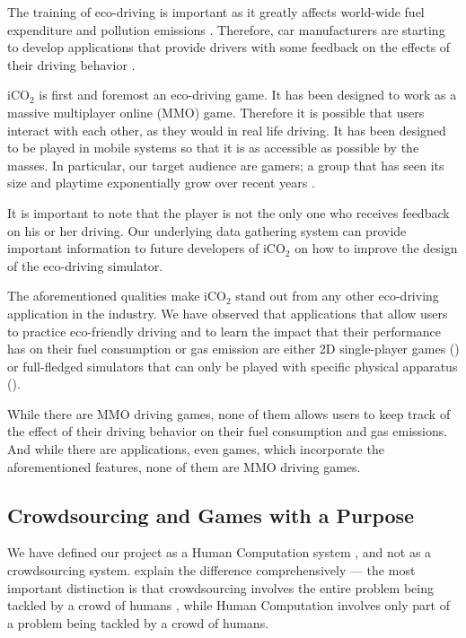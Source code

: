 \documentclass[preprint,authoryear,12pt]{elsarticle}
\begin{document}
The training of eco-driving is important as it greatly affects world-wide fuel expenditure and pollution emissions \citep{barkenbus2010eco,shaheen2012ecodriving}. Therefore, car manufacturers are starting to develop applications that provide drivers with some feedback on the effects of their driving behavior \citep{EcoTools,FiatEcoGame}.

iCO$_2$ is first and foremost an eco-driving game. It has been designed to work as a massive multiplayer online (MMO) game. Therefore it is possible that users interact with each other, as they would in real life driving. It has been designed to be played in mobile systems so that it is as  accessible as possible by the masses. In particular, our target audience are gamers; a group that has seen its size and playtime exponentially grow over recent years \citep{MobileStats}.

It is important to note that the player is not the only one who receives feedback on his or her  driving. Our underlying data gathering system can provide important information to future developers of iCO$_2$ on how to improve the design of the eco-driving simulator.

The aforementioned qualities make iCO$_2$ stand out from any other eco-driving application in the industry.
We have observed that applications that allow users to practice eco-friendly driving and to learn the impact that their performance has on their fuel consumption or gas emission are either 2D single-player games (\cite{EcoGame1, EcoGame2, TruckEcoGame, Moebius, FiatEcoGame}) or full-fledged simulators that can only be played with specific physical apparatus (\cite{EcoSimulator, GreenDino, EcoSimulator2, sabrina2013enhanced}).

While there are MMO driving games, none of them allows users to keep track of the effect of their driving behavior on their fuel consumption and gas emissions. And while there are applications, even games, which incorporate the aforementioned features, none of them are MMO driving games.

\subsection{Crowdsourcing and Games with a Purpose}
\label{subsec:csandgwap}

We have defined our project as a Human Computation system \citep{Yuen.2009,Krause+Smeddinck.2011}, and not as a crowdsourcing system. \cite{Quinn} explain the difference comprehensively --- the most important distinction is that crowdsourcing involves the entire problem being tackled by a crowd of humans \citep{howe2008crowdsourcing}, while Human Computation involves only part of a problem being tackled by a crowd of humans.
\end{document}
